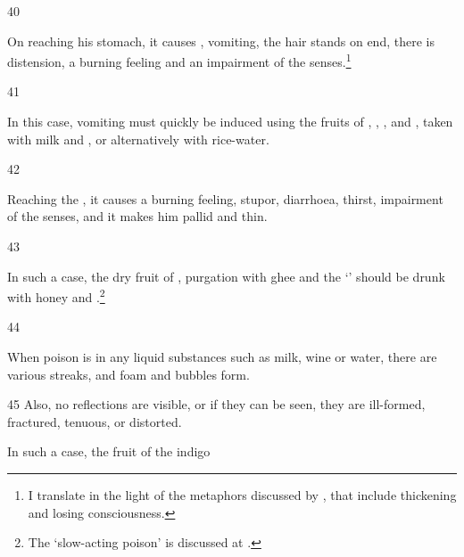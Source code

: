 \begin{translation}
     \item[40]
     
     On reaching his stomach, it causes , vomiting, the hair
stands on end, there is distension, a burning feeling and an impairment of
the senses.\footnote{I translate  in the light of the metaphors
discussed by \citet{meul-2011}, that include thickening and losing
consciousness.}

     \item[41] 
     
In this case, vomiting must quickly be induced using the fruits of
, %
, %
, %
and , %
taken with milk and , or alternatively with
rice-water.
     
     \item[42]
     
    
 Reaching the , it causes a burning feeling, stupor,
diarrhoea, thirst, impairment of the senses,  and it makes
him pallid and thin.
    
      \item [43]
      
 In such a case, the dry fruit of , %
purgation with ghee and the `'
should be drunk with honey and .\footnote{The `slow-acting
poison' is discussed at .}
     
     \item[44]
     
     When poison is in any liquid substances such as milk, wine or water, there are
     various streaks, and foam and bubbles form.  

     \item[45]
     Also, no reflections are
     visible, or if they can be seen, they are ill-formed, fractured, tenuous, or
     distorted.
     
     In such a case, the fruit of the indigo
     
 
    \end{translation}

   
   


